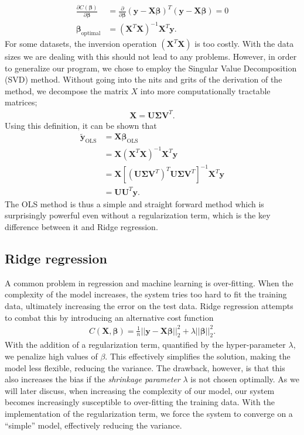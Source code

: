 \documentclass[a4paper, twocolumn]{article}
\begin{document}
\begin{align}
\frac{\partial C(\bm\beta)}{\partial \bm\beta} &= \frac{\partial}{\partial \bm\beta} (\mathbf{y}-\mathbf{X}\bm\beta)^T (\mathbf{y}-\mathbf{X}\bm\beta) = 0 \nonumber \\
\bm\beta_\text{optimal} &= \left(\mathbf{X}^T\mathbf{X}\right)^{-1}\mathbf{X}^T\mathbf{y}.
\end{align}
For some datasets, the inversion operation $\left(\mathbf{X}^T\mathbf{X}\right)$ is too costly. With the data sizes we are dealing with this should not lead to any problems. However, in order to generalize our program, we chose to employ the Singular Value Decomposition (SVD) method. Without going into the nits and grits of the derivation of the method, we decompose the matrix $X$ into more computationally tractable matrices;
\begin{align}
\mathbf{X} = \mathbf{U}\mathbf{\Sigma}\mathbf{V}^T.
\end{align}
Using this definition, it can be shown that
\begin{align}
\tilde{\mathbf{y}}_\text{OLS} &= \mathbf{X}\bm\beta_\text{OLS} \nonumber \\
&= \mathbf{X}\left(\mathbf{X}^T\mathbf{X}\right)^{-1}\mathbf{X}^T\mathbf{y} \nonumber \\
&= \mathbf{X} \left[ \left(\mathbf{U}\bm\Sigma \mathbf{V}^T\right)^T \mathbf{U}\bm\Sigma \mathbf{V}^T \right]^{-1} \mathbf{X}^T \mathbf{y} \nonumber \\
&= \mathbf{U}\mathbf{U}^T\mathbf{y}. \label{eq:principal1}
\end{align}
The OLS method is thus a simple and straight forward method which is surprisingly powerful even without a regularization term, which is the key difference between it and Ridge regression.

\subsection{Ridge regression}
A common problem in regression and machine learning is over-fitting. When the complexity of the model increases, the system tries too hard to fit the training data, ultimately increasing the error on the test data. Ridge regression attempts to combat this by introducing an alternative cost function
\begin{align}
  C(\boldsymbol{X},\boldsymbol{\beta})=\frac{1}{n}\vert\vert \boldsymbol{y}-\boldsymbol{X}\boldsymbol{\beta}\vert\vert_2^2+\lambda\vert\vert \boldsymbol{\beta}\vert\vert_2^2.
\end{align}
With the addition of a regularization term, quantified by the hyper-parameter $\lambda$, we penalize high values of $\beta$. This effectively simplifies the solution, making the model less flexible, reducing the variance. The drawback, however, is that this also increases the bias if the \textit{shrinkage parameter} $\lambda$ is not chosen optimally. As we will later discuss, when increasing the complexity of our model, our system becomes increasingly susceptible to over-fitting the training data. With the implementation of the regularization term, we force the system to converge on a ``simple'' model, effectively reducing the variance. 
\end{document}
